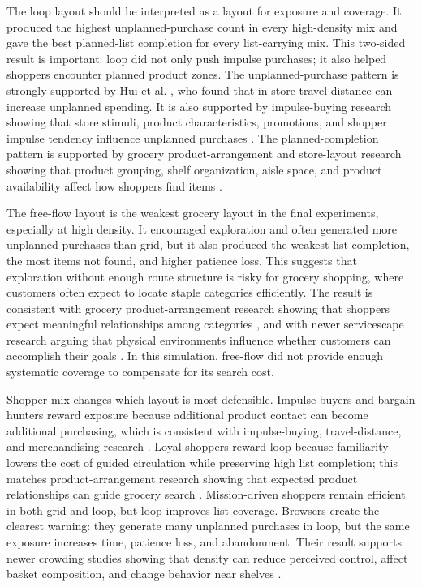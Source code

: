 \documentclass[sigconf,nonacm]{acmart}
\begin{document}
The loop layout should be interpreted as a layout for exposure and coverage. It produced the highest unplanned-purchase count in every high-density mix and gave the best planned-list completion for every list-carrying mix. This two-sided result is important: loop did not only push impulse purchases; it also helped shoppers encounter planned product zones. The unplanned-purchase pattern is strongly supported by Hui et al. \citeyearpar{hui2013}, who found that in-store travel distance can increase unplanned spending. It is also supported by impulse-buying research showing that store stimuli, product characteristics, promotions, and shopper impulse tendency influence unplanned purchases \citep{bellini2017,kacen2012,stilley2010}. The planned-completion pattern is supported by grocery product-arrangement and store-layout research showing that product grouping, shelf organization, aisle space, and product availability affect how shoppers find items \citep{seva2019,andrada2020}.

The free-flow layout is the weakest grocery layout in the final experiments, especially at high density. It encouraged exploration and often generated more unplanned purchases than grid, but it also produced the weakest list completion, the most items not found, and higher patience loss. This suggests that exploration without enough route structure is risky for grocery shopping, where customers often expect to locate staple categories efficiently. The result is consistent with grocery product-arrangement research showing that shoppers expect meaningful relationships among categories \citep{seva2019}, and with newer servicescape research arguing that physical environments influence whether customers can accomplish their goals \citep{mari2013,spence2014}. In this simulation, free-flow did not provide enough systematic coverage to compensate for its search cost.

Shopper mix changes which layout is most defensible. Impulse buyers and bargain hunters reward exposure because additional product contact can become additional purchasing, which is consistent with impulse-buying, travel-distance, and merchandising research \citep{hui2013,bellini2017,kacen2012}. Loyal shoppers reward loop because familiarity lowers the cost of guided circulation while preserving high list completion; this matches product-arrangement research showing that expected product relationships can guide grocery search \citep{seva2019}. Mission-driven shoppers remain efficient in both grid and loop, but loop improves list coverage. Browsers create the clearest warning: they generate many unplanned purchases in loop, but the same exposure increases time, patience loss, and abandonment. Their result supports newer crowding studies showing that density can reduce perceived control, affect basket composition, and change behavior near shelves \citep{blut2020,aydinli2021,luck2015}.
\end{document}
